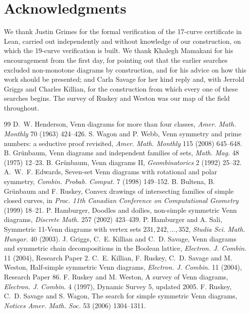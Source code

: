 \documentclass[11pt]{article}
\begin{document}
\section*{Acknowledgments}
We thank Justin Grimes for the formal verification of the 17-curve certificate in Lean, carried out independently and
without knowledge of our construction, on which the 19-curve verification is built. We thank Khalegh Mamakani for his
encouragement from the first day, for pointing out that the earlier searches excluded non-monotone diagrams by
construction, and for his advice on how this work should be presented; and Carla Savage for her kind reply and,
with Jerrold Griggs and Charles Killian, for the construction from which every one of these searches
begins. The survey of Ruskey and Weston was our map of the field throughout.

\begin{thebibliography}{99}
 D.~W. Henderson, Venn diagrams for more than four classes, \emph{Amer. Math. Monthly} 70 (1963) 424--426.
 S. Wagon and P. Webb, Venn symmetry and prime numbers: a seductive proof revisited, \emph{Amer. Math. Monthly} 115 (2008) 645--648.
 B. Gr\"unbaum, Venn diagrams and independent families of sets, \emph{Math. Mag.} 48 (1975) 12--23.
 B. Gr\"unbaum, Venn diagrams II, \emph{Geombinatorics} 2 (1992) 25--32.
 A.~W.~F. Edwards, Seven-set Venn diagrams with rotational and polar symmetry, \emph{Combin. Probab. Comput.} 7 (1998) 149--152.
 B. Bultena, B. Gr\"unbaum and F. Ruskey, Convex drawings of intersecting families of simple closed curves, in \emph{Proc. 11th Canadian Conference on Computational Geometry} (1999) 18--21.
 P. Hamburger, Doodles and doilies, non-simple symmetric Venn diagrams, \emph{Discrete Math.} 257 (2002) 423--439.
 P. Hamburger and A. Sali, Symmetric 11-Venn diagrams with vertex sets $231, 242, \dots, 352$, \emph{Studia Sci. Math. Hungar.} 40 (2003).
 J. Griggs, C.~E. Killian and C.~D. Savage, Venn diagrams and symmetric chain decompositions in the Boolean lattice, \emph{Electron. J. Combin.} 11 (2004), Research Paper 2.
 C.~E. Killian, F. Ruskey, C.~D. Savage and M. Weston, Half-simple symmetric Venn diagrams, \emph{Electron. J. Combin.} 11 (2004), Research Paper 86.
 F. Ruskey and M. Weston, A survey of Venn diagrams, \emph{Electron. J. Combin.} 4 (1997), Dynamic Survey 5, updated 2005.
 F. Ruskey, C.~D. Savage and S. Wagon, The search for simple symmetric Venn diagrams, \emph{Notices Amer. Math. Soc.} 53 (2006) 1304--1311.

\end{thebibliography}
\end{document}
